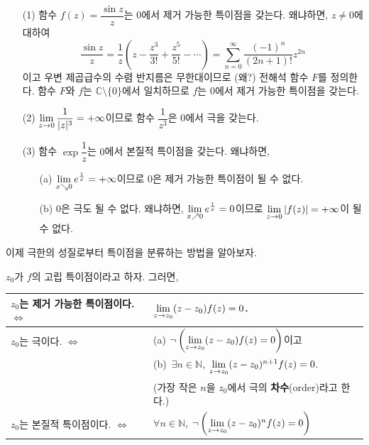 \begin{saltexample}[label=example-4-14]{}{}
\begin{itemize}
\item[(1)] 함수 $f(z)=\dfrac{\sin z}z$는 $0$에서 제거 가능한 특이점을 갖는다.
왜냐하면, $z\ne0$에 대하여
\[
\dfrac{\sin z}z = \dfrac 1z\left( z - \dfrac{z^3}{3!} + \dfrac{z^5}{5!} - \cdots
\right) = \sum_{n=0}^\infty \dfrac{(-1)^n}{(2n+1)!}z^{2n}
\]
이고 우변 제곱급수의 수렴 반지름은 무한대이므로 (왜?)
전해석 함수 $F$를 정의한다. 함수 $F$와 $f$는 $\mathbb C\setminus \{0\}$에서
일치하므로 $f$는 $0$에서 제거 가능한 특이점을 갖는다.
\item[(2)] $\lim\limits_{z\to 0} \displaystyle\frac1{|z|^3} = + \infty$이므로
함수 $\dfrac1{z^3}$은 $0$에서 극을 갖는다.
\item[(3)] 함수 $\exp \dfrac1z$는 $0$에서 본질적 특이점을 갖는다. 왜냐하면,
\begin{itemize}
\item[(a)] $\lim\limits_{x\searrow 0} e^{\frac1x} = + \infty$이므로
$0$은 제거 가능한 특이점이 될 수 없다.
\item[(b)] $0$은 극도 될 수 없다. 왜냐하면,
$\lim\limits_{x\nearrow 0} e^{\frac1x} =0$이므로  
$\lim\limits_{z\to 0} |f(z)| = + \infty$이 될 수 없다.
\end{itemize}
\end{itemize}
\end{saltexample}

이제 극한의 성질로부터 특이점을 분류하는 방법을 알아보자.

\begin{salttheorem} {}{} \label{thm-4-8}
$z_0$가 $f$의 고립 특이점이라고 하자. 그러면,
\begin{center}
{\footnotesize
\begin{tabular}{ |p{4.5cm}|p{6.5cm}| } 
 \hline
$z_0$는 제거 가능한 특이점이다.   \hfill $\Leftrightarrow$ 
& $\lim\limits_{z\to z_0} (z-z_0)f(z)=0$. \\ \hline 
$z_0$는 극이다. \hfill $\Leftrightarrow$ 
& (a) $\neg \left( \lim\limits_{z\to z_0} (z-z_0)f(z) = 0 \right)$이고 \\
& (b)~$\exists n\in \mathbb N$, 
$\lim\limits_{z\to z_0} (z-z_0)^{n+1}f(z) = 0$. \\
& (가장 작은 $n$을 $z_0$에서 극의 \textbf{차수}(order)라고 한다.)
\index{극의 차수(order of a pole)} \\ \hline
$z_0$는 본질적 특이점이다. \hfill $\Leftrightarrow$ 
& $\forall n\in \mathbb N$,  
$\neg\left( \lim\limits_{z\to z_0} (z-z_0)^nf(z) = 0 \right)$ \\ 
 \hline
\end{tabular}
}
\end{center}
\end{salttheorem}

